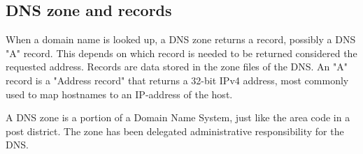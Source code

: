 \subsection{DNS zone and records}
When a domain name is looked up,  a DNS zone returns a record, possibly a DNS "A" record. This depends on which record is needed to be returned considered the requested address. Records are data stored in the zone files of the DNS. An "A" record is a "Address record" that returns a 32-bit IPv4 address, most commonly used to map hostnames to an IP-address of the host.

A DNS zone is a portion of a Domain Name System, just like the area code in a post district. The zone has been delegated administrative responsibility for the DNS.